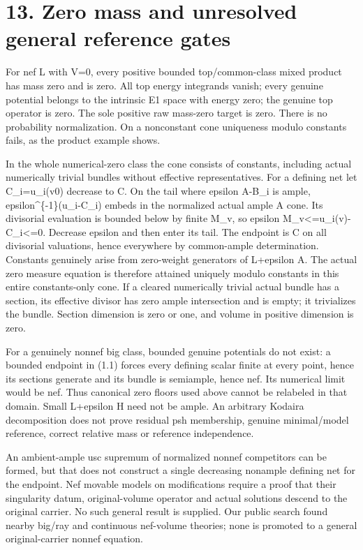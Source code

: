 \documentclass[
  10pt,
]{article}
\begin{document}
\section{13. Zero mass and unresolved general reference
gates}\label{zero-mass-and-unresolved-general-reference-gates}

For nef L with V=0, every positive bounded top/common-class mixed
product has mass zero and is zero. All top energy integrands vanish;
every genuine potential belongs to the intrinsic E1 space with energy
zero; the genuine top operator is zero. The sole positive raw mass-zero
target is zero. There is no probability normalization. On a nonconstant
cone uniqueness modulo constants fails, as the product example shows.

In the whole numerical-zero class the cone consists of constants,
including actual numerically trivial bundles without effective
representatives. For a defining net let C\_i=u\_i(v0) decrease to C. On
the tail where epsilon A-B\_i is ample, epsilon\^{}\{-1\}(u\_i-C\_i)
embeds in the normalized actual ample A cone. Its divisorial evaluation
is bounded below by finite M\_v, so epsilon
M\_v\textless=u\_i(v)-C\_i\textless=0. Decrease epsilon and then enter
its tail. The endpoint is C on all divisorial valuations, hence
everywhere by common-ample determination. Constants genuinely arise from
zero-weight generators of L+epsilon A. The actual zero measure equation
is therefore attained uniquely modulo constants in this entire
constants-only cone. If a cleared numerically trivial actual bundle has
a section, its effective divisor has zero ample intersection and is
empty; it trivializes the bundle. Section dimension is zero or one, and
volume in positive dimension is zero.

For a genuinely nonnef big class, bounded genuine potentials do not
exist: a bounded endpoint in (1.1) forces every defining scalar finite
at every point, hence its sections generate and its bundle is semiample,
hence nef. Its numerical limit would be nef. Thus canonical zero floors
used above cannot be relabeled in that domain. Small L+epsilon H need
not be ample. An arbitrary Kodaira decomposition does not prove residual
psh membership, genuine minimal/model reference, correct relative mass
or reference independence.

An ambient-ample usc supremum of normalized nonnef competitors can be
formed, but that does not construct a single decreasing nonample
defining net for the endpoint. Nef movable models on modifications
require a proof that their singularity datum, original-volume operator
and actual solutions descend to the original carrier. No such general
result is supplied. Our public search found nearby big/ray and
continuous nef-volume theories; none is promoted to a general
original-carrier nonnef equation.
\end{document}
